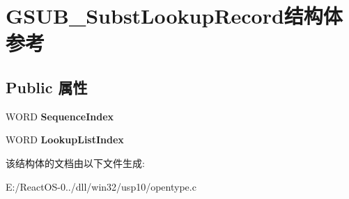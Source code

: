 \hypertarget{struct_g_s_u_b___subst_lookup_record}{}\section{G\+S\+U\+B\+\_\+\+Subst\+Lookup\+Record结构体 参考}
\label{struct_g_s_u_b___subst_lookup_record}
\subsection*{Public 属性}
\begin{DoxyCompactItemize}
\item 
\mbox{\label{struct_g_s_u_b___subst_lookup_record_a4972ed430db7691343b8eddeeedfac76}} 
W\+O\+RD {\bfseries Sequence\+Index}
\item 
\mbox{\label{struct_g_s_u_b___subst_lookup_record_a960e1b3865fa37fbb365e74b5477224d}} 
W\+O\+RD {\bfseries Lookup\+List\+Index}
\end{DoxyCompactItemize}


该结构体的文档由以下文件生成\+:\begin{DoxyCompactItemize}
\item 
E\+:/\+React\+O\+S-\/0../dll/win32/usp10/opentype.\+c\end{DoxyCompactItemize}
